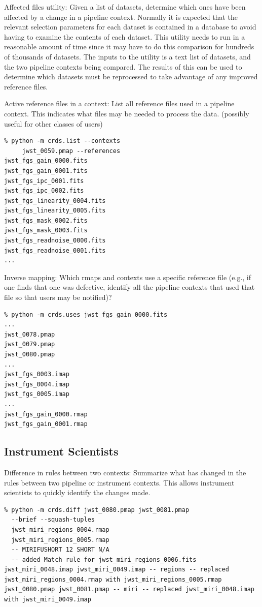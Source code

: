 \documentclass[final,authoryear,5p,times,twocolumn]{elsarticle}
\begin{document}
Affected files utility: Given a list of datasets, determine which ones have
been affected by a change in a pipeline context. Normally it is expected that
the relevant selection parameters for each dataset is contained in a database
to avoid having to examine the contents of each dataset. This utility needs to
run in a reasonable amount of time since it may have to do this comparison for
hundreds of thousands of datasets. The inputs to the utility is a text list of
datasets, and the two pipeline contexts being compared. The results of this
can be used to determine which datasets must be reprocessed to take advantage
of any improved reference files.

Active reference files in a context: List all reference files used in a
pipeline context. This indicates what files may be needed to process the
data. (possibly useful for other classes of users)

\begin{verbatim}
% python -m crds.list --contexts 
     jwst_0059.pmap --references
jwst_fgs_gain_0000.fits
jwst_fgs_gain_0001.fits
jwst_fgs_ipc_0001.fits
jwst_fgs_ipc_0002.fits
jwst_fgs_linearity_0004.fits
jwst_fgs_linearity_0005.fits
jwst_fgs_mask_0002.fits
jwst_fgs_mask_0003.fits
jwst_fgs_readnoise_0000.fits
jwst_fgs_readnoise_0001.fits
...
\end{verbatim}

Inverse mapping: Which rmaps and contexts use a specific reference file (e.g.,
if one finds that one was defective, identify all the pipeline contexts that
used that file so that users may be notified)?

\begin{verbatim}
% python -m crds.uses jwst_fgs_gain_0000.fits
...
jwst_0078.pmap
jwst_0079.pmap
jwst_0080.pmap
...
jwst_fgs_0003.imap
jwst_fgs_0004.imap
jwst_fgs_0005.imap
...
jwst_fgs_gain_0000.rmap
jwst_fgs_gain_0001.rmap
\end{verbatim}

\subsection{Instrument Scientists}

Difference in rules between two contexts: Summarize what has changed in the
rules between two pipeline or instrument contexts. This allows instrument
scientists to quickly identify the changes made.

\begin{verbatim}
% python -m crds.diff jwst_0080.pmap jwst_0081.pmap 
  --brief --squash-tuples
  jwst_miri_regions_0004.rmap 
  jwst_miri_regions_0005.rmap 
  -- MIRIFUSHORT 12 SHORT N/A 
  -- added Match rule for jwst_miri_regions_0006.fits
jwst_miri_0048.imap jwst_miri_0049.imap -- regions -- replaced jwst_miri_regions_0004.rmap with jwst_miri_regions_0005.rmap
jwst_0080.pmap jwst_0081.pmap -- miri -- replaced jwst_miri_0048.imap with jwst_miri_0049.imap
\end{verbatim}
\end{document}
